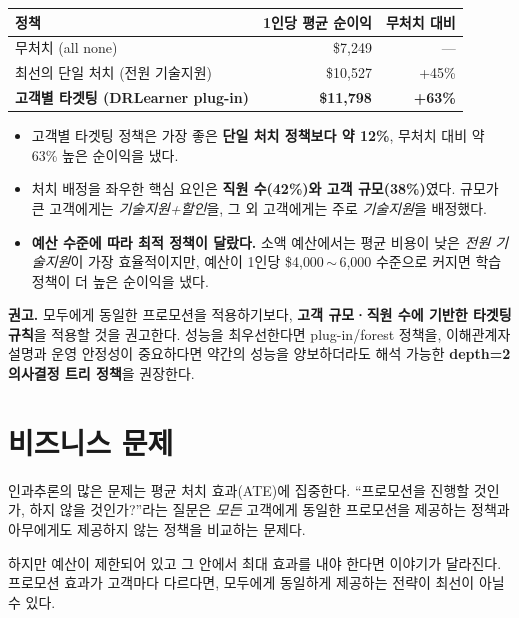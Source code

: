 \documentclass[11pt]{article}
\newcommand{\kpi}[1]{{\color{brand}\bfseries #1}}
\begin{document}
\begin{table}[h]
\centering
\small
\begin{tabular}{lrr}
\toprule
정책 & 1인당 평균 순이익 & 무처치 대비 \\
\midrule
무처치 (all none) & \$7{,}249 & --- \\
최선의 단일 처치 (전원 기술지원) & \$10{,}527 & +45\% \\
\textbf{고객별 타겟팅 (DRLearner plug-in)} & \kpi{\$11{,}798} & \kpi{+63\%} \\
\bottomrule
\end{tabular}
\end{table}

\begin{itemize}[leftmargin=1.4em, itemsep=2pt]
  \item 고객별 타겟팅 정책은 가장 좋은 \textbf{단일 처치 정책보다 약 12\%}, 무처치 대비 약 63\% 높은 순이익을 냈다.
  \item 처치 배정을 좌우한 핵심 요인은 \textbf{직원 수(42\%)와 고객 규모(38\%)}였다. 규모가 큰 고객에게는 \emph{기술지원+할인}을, 그 외 고객에게는 주로 \emph{기술지원}을 배정했다.
  \item \textbf{예산 수준에 따라 최적 정책이 달랐다.} 소액 예산에서는 평균 비용이 낮은 \emph{전원 기술지원}이 가장 효율적이지만, 예산이 1인당 \$4{,}000\,$\sim$\,6{,}000 수준으로 커지면 학습 정책이 더 높은 순이익을 냈다.
\end{itemize}

\textbf{권고.} 모두에게 동일한 프로모션을 적용하기보다, \textbf{고객 규모·직원 수에 기반한 타겟팅 규칙}을 적용할 것을 권고한다. 성능을 최우선한다면 plug-in/forest 정책을, 이해관계자 설명과 운영 안정성이 중요하다면 약간의 성능을 양보하더라도 해석 가능한 \textbf{depth=2 의사결정 트리 정책}을 권장한다.

\newpage

\section{비즈니스 문제}

인과추론의 많은 문제는 평균 처치 효과(ATE)에 집중한다. ``프로모션을 진행할 것인가, 하지 않을 것인가?''라는 질문은 \emph{모든} 고객에게 동일한 프로모션을 제공하는 정책과 아무에게도 제공하지 않는 정책을 비교하는 문제다.

하지만 예산이 제한되어 있고 그 안에서 최대 효과를 내야 한다면 이야기가 달라진다. 프로모션 효과가 고객마다 다르다면, 모두에게 동일하게 제공하는 전략이 최선이 아닐 수 있다.
\end{document}
